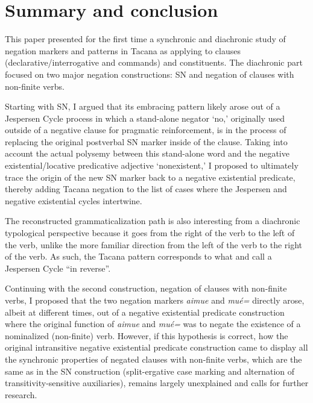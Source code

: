 \documentclass[output=paper,draft,draftmode,colorlinks,citecolor=brown]{langscibook}
\begin{document}
\section{Summary and conclusion}\label{sec:tacana-11}

This paper presented for the first time a synchronic and diachronic study of negation markers and patterns in Tacana as applying to clauses (declarative\slash interrogative and commands) and constituents. The diachronic part focused on two major negation constructions: SN and negation of clauses with non-finite verbs.

Starting with SN, I argued that its embracing pattern likely arose out of a
Jespersen Cycle process in which a stand-alone negator `no,' originally
used outside of a negative clause for pragmatic reinforcement, is in the
process of replacing the original postverbal SN marker inside of the
clause. Taking into account the actual polysemy between this stand-alone
word and the negative existential\slash locative predicative adjective
‘nonexistent,' I proposed to ultimately trace the origin of the new SN
marker back to a negative existential predicate, thereby adding Tacana
negation to the list of cases where the Jespersen and negative existential cycles intertwine.

The reconstructed grammaticalization path is also interesting from a
diachronic typological perspective because it goes from the right of the
verb to the left of the verb, unlike the more familiar direction from the
left of the verb to the right of the verb. As such, the Tacana pattern
corresponds to what \citet{AuweraVossen2016} and \citet{Vossen2016} call a
Jespersen Cycle ``in reverse''.

Continuing with the second construction, negation of clauses with
non-finite verbs, I proposed that the two negation markers \textit{aimue} and \textit{mué=} directly arose, albeit at
different times, out of a negative existential predicate construction where
the original function of \textit{aimue} and \textit{mué=} was to negate the
existence of a nominalized (non-finite) verb. However, if this hypothesis
is correct, how the original
intransitive negative existential predicate construction came to display all the synchronic properties
of negated clauses with non-finite verbs, which are the same as in the SN
construction (split-ergative case marking
and alternation of transitivity-sensitive auxiliaries), remains
largely unexplained and calls for further research.
\end{document}

